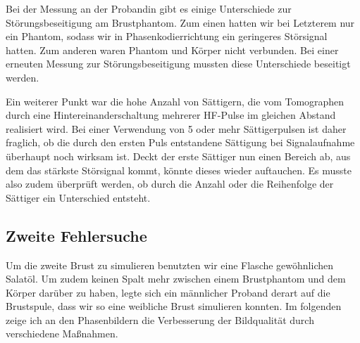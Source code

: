 \documentclass[
    11pt,
    ngerman
]{scrbook}
\begin{document}
Bei der Messung an der Probandin gibt es einige Unterschiede zur
Störungsbeseitigung am Brustphantom. Zum einen hatten wir bei Letzterem nur
ein Phantom, sodass wir in Phasenkodierrichtung ein geringeres Störsignal
hatten. Zum anderen waren Phantom und Körper nicht verbunden.
Bei einer erneuten Messung zur Störungsbeseitigung mussten
diese Unterschiede beseitigt werden. 

Ein weiterer Punkt war die hohe Anzahl von Sättigern, die vom Tomographen
durch eine Hintereinanderschaltung mehrerer HF-Pulse im gleichen Abstand
realisiert wird. Bei einer Verwendung von 5 oder mehr Sättigerpulsen ist daher
fraglich, ob die durch den ersten Puls entstandene Sättigung bei
Signalaufnahme überhaupt noch wirksam ist. Deckt der erste Sättiger nun einen
Bereich ab, aus dem das stärkste Störsignal kommt, könnte dieses wieder
auftauchen. Es musste also zudem überprüft werden, ob durch die Anzahl oder die
Reihenfolge der Sättiger ein Unterschied entsteht.

\subsection{Zweite Fehlersuche}

Um die zweite Brust zu simulieren benutzten wir eine Flasche gewöhnlichen
Salatöl. Um zudem keinen Spalt mehr zwischen einem Brustphantom und dem Körper
darüber zu haben, legte sich ein männlicher Proband derart auf die Brustspule,
dass wir so eine weibliche Brust simulieren konnten. Im folgenden zeige ich an
den Phasenbildern die Verbesserung der Bildqualität durch verschiedene
Maßnahmen.
\end{document}
